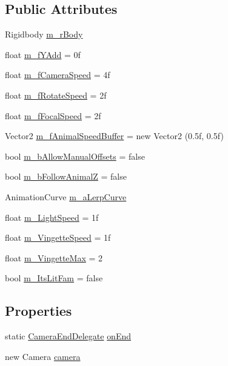 \subsection*{Public Attributes}
\begin{DoxyCompactItemize}
\item 
Rigidbody \mbox{\hyperlink{class_camera_controller_ad6e1e777936be668f56a0fe183b6917d}{m\+\_\+r\+Body}}
\item 
float \mbox{\hyperlink{class_camera_controller_aa5f8628654be31b528a929ae61c5ab52}{m\+\_\+f\+Y\+Add}} = 0f
\item 
float \mbox{\hyperlink{class_camera_controller_a8798ad2d23175bf6a1fc55905ee8e22a}{m\+\_\+f\+Camera\+Speed}} = 4f
\item 
float \mbox{\hyperlink{class_camera_controller_a2353caba06439ca6ec202ea74d5a607d}{m\+\_\+f\+Rotate\+Speed}} = 2f
\item 
float \mbox{\hyperlink{class_camera_controller_ac00593a666b5192bcd109a0eebf7a272}{m\+\_\+f\+Focal\+Speed}} = 2f
\item 
Vector2 \mbox{\hyperlink{class_camera_controller_af868dbed0987e517c1d5756b3a83610a}{m\+\_\+f\+Animal\+Speed\+Buffer}} = new Vector2 (0.\+5f, 0.\+5f)
\item 
bool \mbox{\hyperlink{class_camera_controller_a5a86f74242b3547e6f2d0d85bac35019}{m\+\_\+b\+Allow\+Manual\+Offsets}} = false
\item 
bool \mbox{\hyperlink{class_camera_controller_ab3e3057150c585361a707031c0fb2d29}{m\+\_\+b\+Follow\+AnimalZ}} = false
\item 
Animation\+Curve \mbox{\hyperlink{class_camera_controller_a70e07e27e4f1077febe45becebdc9b01}{m\+\_\+a\+Lerp\+Curve}}
\item 
float \mbox{\hyperlink{class_camera_controller_a1ff4ea82ac72e8be51d6ed1093fbc5e5}{m\+\_\+\+Light\+Speed}} = 1f
\item 
float \mbox{\hyperlink{class_camera_controller_aa0020e312684263a817d73d6c492a54d}{m\+\_\+\+Vingette\+Speed}} = 1f
\item 
float \mbox{\hyperlink{class_camera_controller_a07ce81630c7ad6f66a9d047cfb185e45}{m\+\_\+\+Vingette\+Max}} = 2
\item 
bool \mbox{\hyperlink{class_camera_controller_a85d67c9a5d7cb32ede2fbf569864cfa3}{m\+\_\+\+Its\+Lit\+Fam}} = false
\end{DoxyCompactItemize}
\subsection*{Properties}
\begin{DoxyCompactItemize}
\item 
static \mbox{\hyperlink{_camera_controller_8cs_a2329f0155caaad919c97c5f57e062b81}{Camera\+End\+Delegate}} \mbox{\hyperlink{class_camera_controller_a9d88e2bce9ea6e7279f6524722069ae3}{on\+End}}
\item 
new Camera \mbox{\hyperlink{class_camera_controller_a6d8239eb360decf9f5cdace7bcd9cc19}{camera}}
\end{DoxyCompactItemize}
